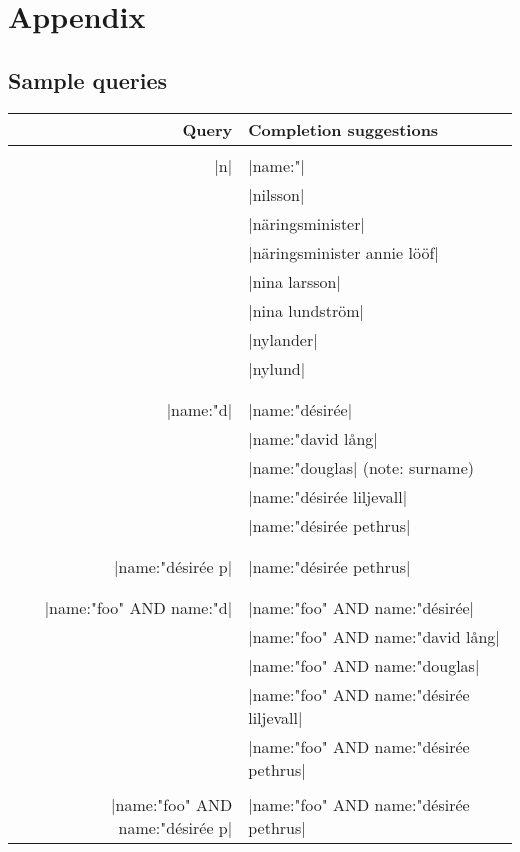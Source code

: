 \newpage
\section*{Appendix}\label{appendix}

\subsection*{Sample queries}
\begin{tabular}{ r | l}
    Query & Completion suggestions \\    
    \hline                    
    & \\
  |n| & |name:"| \\
      & |nilsson| \\
      & |näringsminister| \\
      & |näringsminister annie lööf| \\
      & |nina larsson| \\
      & |nina lundström| \\
      & |nylander| \\
      & |nylund| \\
      & \\
    \hline
    & \\
  |name:"d| & |name:"désirée| \\
            & |name:"david lång| \\
            & |name:"douglas| \footnotesize{(note: surname)}\\
            & |name:"désirée liljevall| \\
            & |name:"désirée pethrus| \\
            & \\
    \hline
    & \\
    |name:"désirée p| & |name:"désirée pethrus| \\
    & \\
    \hline
    & \\
    |name:"foo" AND name:"d| & |name:"foo" AND name:"désirée| \\
                           & |name:"foo" AND name:"david lång| \\
                           & |name:"foo" AND name:"douglas| \\
                           & |name:"foo" AND name:"désirée liljevall| \\
                           & |name:"foo" AND name:"désirée pethrus| \\
                           & \\
    \hline
    |name:"foo" AND name:"désirée p| & |name:"foo" AND name:"désirée pethrus| \\
\end{tabular}


